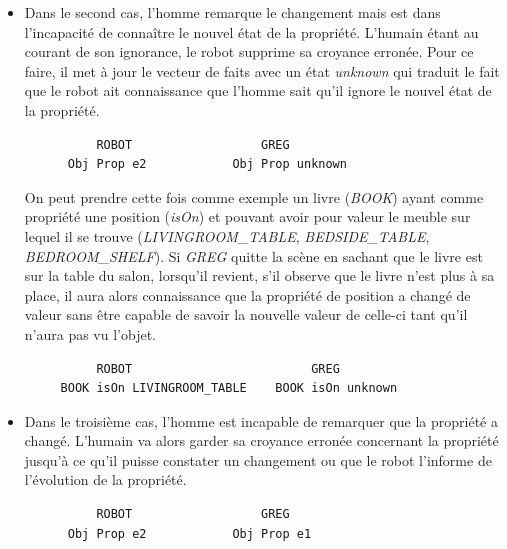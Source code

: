 \documentclass[a4paper,11pt,twoside]{StyleThese}
\begin{document}
\begin{itemize}
\item Dans le second cas, l'homme remarque le changement mais est dans l'incapacité de connaître le nouvel état de la propriété. L'humain étant au courant de son ignorance, le robot supprime sa croyance erronée. Pour ce faire, il met à jour le vecteur de faits avec un état \textit{unknown} qui traduit le fait que le robot ait connaissance que l'homme sait qu'il ignore le nouvel état de la propriété.


\begin{scriptsize}
\begin{verbatim}
          ROBOT                  GREG
      Obj Prop e2            Obj Prop unknown
\end{verbatim}
\end{scriptsize}



On peut prendre cette fois comme exemple un livre (\textit{BOOK}) ayant comme propriété une position (\textit{isOn}) et pouvant avoir pour valeur le meuble sur lequel il se trouve (\textit{LIVINGROOM\_TABLE}, \textit{BEDSIDE\_TABLE}, \textit{BEDROOM\_SHELF}). Si \textit{GREG} quitte la scène en sachant que le livre est sur la table du salon, lorsqu'il revient, s'il observe que le livre n'est plus à sa place, il aura alors connaissance que la propriété de position a changé de valeur sans être capable de savoir la nouvelle valeur de celle-ci tant qu'il n'aura pas vu l'objet.

\begin{scriptsize}
\begin{verbatim}
          ROBOT                         GREG
     BOOK isOn LIVINGROOM_TABLE    BOOK isOn unknown
\end{verbatim}
\end{scriptsize}



\item Dans le troisième cas, l'homme est incapable de remarquer que la propriété a changé. L'humain va alors garder sa croyance erronée concernant la propriété jusqu'à ce qu'il puisse constater un changement ou que le robot l'informe de l'évolution de la propriété. 

\begin{scriptsize}
\begin{verbatim}
          ROBOT                  GREG
      Obj Prop e2            Obj Prop e1
\end{verbatim}
\end{scriptsize}


\end{itemize}
\end{document}
